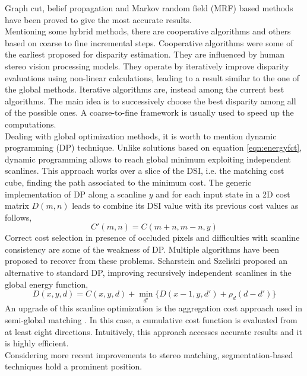 Graph cut, belief propagation and Markov random field (MRF) based methods have been proved to give the most accurate results. \\
Mentioning some hybrid methods, there are cooperative algorithms and others based on coarse to fine incremental steps.
Cooperative algorithms were some of the earliest proposed for disparity estimation. They are influenced by human stereo vision processing models. 
They operate by iteratively improve disparity evaluations using non-linear calculations, leading to a result similar to the one of the global methods.
Iterative algorithms are, instead among the current best algorithms.
The main idea is to successively choose the best disparity among all of the possible ones. 
A coarse-to-fine framework is usually used to speed up the computations.\\
Dealing with global optimization methods, it is worth to mention dynamic programming (DP) technique.
Unlike solutions based on equation \ref{eqn:energyfct}, dynamic programming allows to reach global minimum exploiting independent scanlines.
This approach works over a slice of the DSI, i.e. the matching cost cube, finding the path associated to the minimum cost.
The generic implementation of DP along a scanline $y$ and for each input state in a 2D cost matrix $D(m, n)$ leads to combine its DSI value with its previous cost values as follows,
\begin{equation}\label{eqn:dynamicprog}
	C'(m,n) = C(m + n, m - n, y)
\end{equation}
Correct cost selection in presence of occluded pixels and difficulties with scanline consistency are some of the weakness of DP.
Multiple algorithms have been proposed to recover from these problems. 
Scharstein and Szeliski \citep{Scharstein2001} proposed an alternative to standard DP, improving recursively independent scanlines in the global energy function,
\begin{equation}\label{eqn:DPoptimization}
	D(x,y,d) = C(x,y,d) + \min_{d'}\{ D(x - 1, y, d') + \rho_{d} (d - d') \}
\end{equation}
An upgrade of this scanline optimization is the aggregation cost approach used in semi-global matching \citep{Hirschmuller2008}.
In this case, a cumulative cost function is evaluated from at least eight directions.
Intuitively, this approach accesses accurate results and it is highly efficient. \\
Considering more recent improvements to stereo matching, segmentation-based techniques hold a prominent position.
